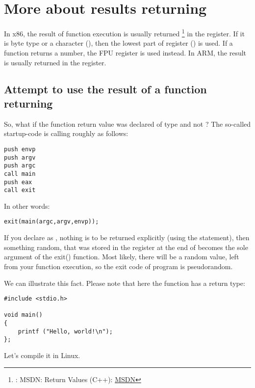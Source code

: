 \chapter{More about results returning}


In x86, the result of function execution is usually returned
\footnote{\Seealso: MSDN: Return Values (C++): \href{http://go.yurichev.com/17258}{MSDN}}
in the \EAX register. 
If it is byte type or a character (\Tchar), then the lowest part of register \EAX (\AL) is used. 
If a function returns a \Tfloat number, the FPU register  is used instead.
\ifdefined\IncludeARM
{}
In ARM, the result is usually returned in the  register.
\fi

\section{Attempt to use the result of a function returning \Tvoid}

So, what if the \main function return value was declared of type \Tvoid and not \Tint?
The so-called startup-code is calling \main roughly as follows:

\begin{lstlisting}
push envp
push argv
push argc
call main
push eax
call exit
\end{lstlisting}

In other words:

\begin{lstlisting}
exit(main(argc,argv,envp));
\end{lstlisting}

If you declare \main as \Tvoid, nothing is to be returned explicitly (using the  statement),
then something random, that was stored in the \EAX register at the end of \main becomes 
the sole argument of the exit() function.
Most likely, there will be a random value, left from your function execution, so the exit code of program is pseudorandom.
\par
We can illustrate this fact. 
Please note that here the \main function has a \Tvoid return type:

\begin{lstlisting}
#include <stdio.h>

void main()
{
	printf ("Hello, world!\n");
};
\end{lstlisting}

Let's compile it in Linux.

